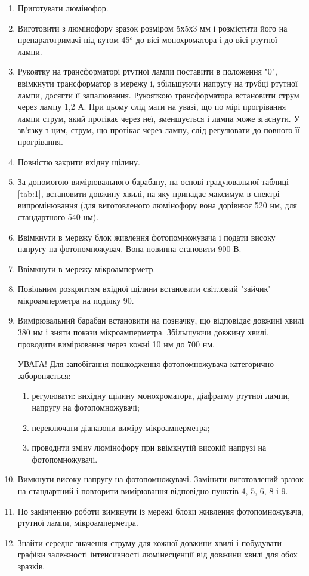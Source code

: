 \documentclass[twocolumn]{el-author}
\begin{document}
\begin{enumerate}
	\item Приготувати люмінофор.
	\item Виготовити з люмінофору зразок розміром 5х5х3 мм і розмістити
його на препаратотримачі під кутом 45$^{o}$ до вісі монохроматора і
до вісі ртутної лампи.
	\item Рукоятку на трансформаторі ртутної лампи поставити в
положення "0", ввімкнути трансформатор в мережу і,
збільшуючи напругу на трубці ртутної лампи, досягти її
запалювання. Рукояткою трансформатора встановити струм через
лампу 1,2 А. При цьому слід мати на увазі, що по мірі
прогрівання лампи струм, який протікає через неї, зменшується і
лампа може згаснути. У зв'язку з цим, струм, що протікає через
лампу, слід регулювати до повного її прогрівання.
	\item Повністю закрити вхідну щілину.
	\item За допомогою вимірювального барабану, на основі
градуювальної таблиці \ref{tab:1}, встановити довжину хвилі, на яку
припадає максимум в спектрі випромінювання (для
виготовленого  люмінофору вона дорівнює 520 нм, для
стандартного 540 нм).
	\item Ввімкнути в мережу блок живлення фотопомножувача і подати
високу напругу на фотопомножувач. Вона повинна становити
900 В.
	\item Ввімкнути в мережу мікроамперметр.
	\item Повільним розкриттям вхідної щілини встановити світловий
"зайчик" мікроамперметра на поділку 90.
	\item Вимірювальний барабан встановити на позначку, що відповідає
довжині хвилі 380 нм і зняти покази мікроамперметра.
Збільшуючи довжину хвилі, проводити вимірювання через кожні
10 нм до 700 нм.

УВАГА! Для запобігання пошкодження фотопомножувача категорично
забороняється:
	\begin{enumerate}
		\item регулювати: вихідну щілину монохроматора, діафрагму ртутної
лампи, напругу на фотопомножувачі;
		\item переключати діапазони виміру мікроамперметра;
		\item проводити зміну люмінофору при ввімкнутій високій напрузі на
фотопомножувачі.
	\end{enumerate}
	\item Вимкнути високу напругу на фотопомножувачі. Замінити
виготовлений зразок на стандартний і повторити вимірювання
відповідно пунктів 4, 5, 6, 8 і 9.
	\item По закінченню роботи вимкнути із мережі блоки живлення
фотопомножувача, ртутної лампи, мікроамперметра.
	\item Знайти середнє значення струму для кожної довжини хвилі і
побудувати графіки залежності інтенсивності люмінесценції від
довжини хвилі для обох зразків.
\end{enumerate}
\end{document}
